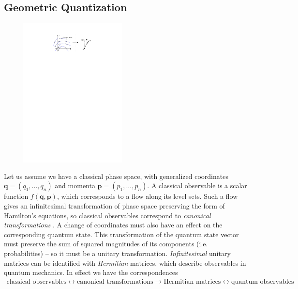 \documentclass[final,3p,mathptmx]{elsarticle}
\begin{document}
\subsection{Geometric Quantization}
\begingroup
\setlength{\columnsep}{6pt}
\setlength{\intextsep}{0pt}
\begin{figure}
	\includegraphics[width=0.48\textwidth, keepaspectratio]{figures/quantization.pdf}
	\label{fig:cylinder}
\end{figure}Let us assume we have a classical phase space, with generalized coordinates  $\mathbf{q} = (q_{1},\ldots,q_{n})$ and momenta $\mathbf{p} = (p_{1}, \ldots, p_{n})$. A classical observable is a scalar function $f(\mathbf{q},\mathbf{p})$, which corresponds to a flow along its level sets. Such a flow gives an infinitesimal transformation of phase space preserving the form of Hamilton's equations, so classical observables correspond to \emph{canonical transformations} \cite{hand1998analytical}. A change of coordinates must also have an effect on the corresponding quantum state. This transformation of the quantum state vector must preserve the sum of squared magnitudes of its components (i.e. probabilities) -- so it must be a unitary transformation. \emph{Infinitesimal} unitary matrices can be identified with \emph{Hermitian} matrices, which describe observables in quantum mechanics. In effect we have the correspondences
\begin{align*}
\text{classical observables} \longleftrightarrow \text{canonical transformations}
\longrightarrow \text{Hermitian matrices} \longleftrightarrow \text{quantum observables}
\end{align*} 
\end{document}
